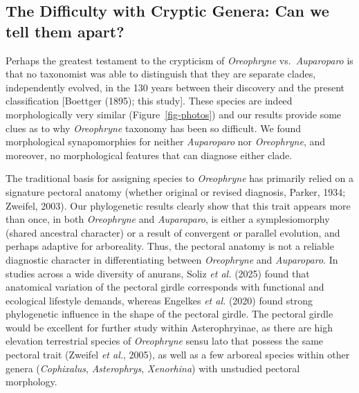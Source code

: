 \documentclass[
  letterpaper,
  DIV=11,
  numbers=noendperiod]{scrartcl}
\begin{document}
\subsection{The Difficulty with Cryptic Genera: Can we tell them
apart?}\label{the-difficulty-with-cryptic-genera-can-we-tell-them-apart}

Perhaps the greatest testament to the crypticism of \emph{Oreophryne}
vs.~\emph{Auparoparo} is that no taxonomist was able to distinguish that
they are separate clades, independently evolved, in the 130 years
between their discovery and the present classification {[}Boettger
(1895); this study{]}. These species are indeed morphologically very
similar (Figure~\ref{fig-photos}) and our results provide some clues as
to why \emph{Oreophryne} taxonomy has been so difficult. We found
morphological synapomorphies for neither \emph{Auparoparo} nor
\emph{Oreophryne}, and moreover, no morphological features that can
diagnose either clade.

The traditional basis for assigning species to \emph{Oreophryne} has
primarily relied on a signature pectoral anatomy (whether original or
revised diagnosis, Parker, 1934; Zweifel, 2003). Our phylogenetic
results clearly show that this trait appears more than once, in both
\emph{Oreophryne} and \emph{Auparaparo}, is either a symplesiomorphy
(shared ancestral character) or a result of convergent or parallel
evolution, and perhaps adaptive for arboreality. Thus, the pectoral
anatomy is not a reliable diagnostic character in differentiating
between \emph{Oreophryne} and \emph{Auparoparo}. In studies across a
wide diversity of anurans, Soliz \emph{et al.} (2025) found that
anatomical variation of the pectoral girdle corresponds with functional
and ecological lifestyle demands, whereas Engelkes \emph{et al.} (2020)
found strong phylogenetic influence in the shape of the pectoral girdle.
The pectoral girdle would be excellent for further study within
Asterophryinae, as there are high elevation terrestrial species of
\emph{Oreophryne} sensu lato that possess the same pectoral trait
(Zweifel \emph{et al.}, 2005), as well as a few arboreal species within
other genera (\emph{Cophixalus}, \emph{Asterophrys}, \emph{Xenorhina})
with unstudied pectoral morphology.
\end{document}
